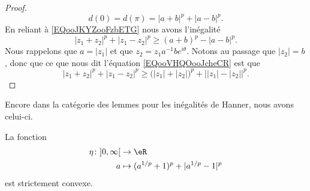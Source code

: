 \begin{proof}
    \begin{equation}
        d(0)=d(\pi)=| a+b |^p+| a-b |^p.
    \end{equation}
    En reliant à \eqref{EQooJKYZooFzbETG} nous avons l'inégalité
    \begin{equation}        \label{EQooVHQOooJcheCR}
        | z_1+z_2 |^p+| z_1-z_2 |^p\geq (a+b)^p-| a-b |^p.
    \end{equation}
    Nous rappelons que \( a=| z_1 |\) et que \( z_2=z_1a^{-1}b e^{i\theta}\). Notons au passage que \( | z_2 |=b\), donc que ce que nous dit l'équation \eqref{EQooVHQOooJcheCR} est que
    \begin{equation}
        | z_1+z_2 |^p+| z_1-z_2 |^p\geq \big( | z_1 |+| z_2 | \big)^p+\big| | z_1 |-| z_2 | \big|^p.
    \end{equation}
\end{proof}

Encore dans la catégorie des lemmes pour les inégalités de Hanner, nous avons celui-ci.
\begin{lemma}     \label{LEMooTCNEooADpNai}
    La fonction
    \begin{equation}
        \begin{aligned}
            \eta\colon \mathopen] 0 , \infty \mathclose[ & \to \eR                               \\
            a                                            & \mapsto (a^{1/p}+1)^p+| a^{1/p}-1 |^p
        \end{aligned}
    \end{equation}
    est strictement convexe.
\end{lemma}

